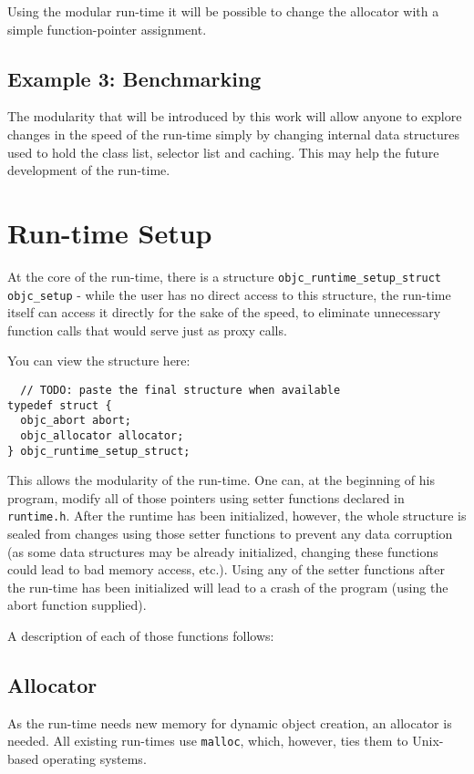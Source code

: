 Using the modular run-time it will be possible to change the allocator with a simple function-pointer assignment.


\subsection{Example 3: Benchmarking}

The modularity that will be introduced by this work will allow anyone to explore changes in the speed of the run-time simply by changing internal data structures used to hold the class list, selector list and caching. This may help the future development of the run-time.


\section{Run-time Setup}

At the core of the run-time, there is a structure \verb=objc_runtime_setup_struct objc_setup= - while the user has no direct access to this structure, the run-time itself can access it directly for the sake of the speed, to eliminate unnecessary function calls that would serve just as proxy calls.

You can view the structure here:

\begin{verbatim}
  // TODO: paste the final structure when available
typedef struct {
  objc_abort abort;
  objc_allocator allocator;
} objc_runtime_setup_struct;
\end{verbatim}

This allows the modularity of the run-time. One can, at the beginning of his program, modify all of those pointers using setter functions declared in \verb=runtime.h=. After the runtime has been initialized, however, the whole structure is sealed from changes using those setter functions to prevent any data corruption (as some data structures may be already initialized, changing these functions could lead to bad memory access, etc.). Using any of the setter functions after the run-time has been initialized will lead to a crash of the program (using the abort function supplied).

A description of each of those functions follows:

\subsection{Allocator}

As the run-time needs new memory for dynamic object creation, an allocator is needed. All existing run-times use \verb=malloc=, which, however, ties them to Unix-based operating systems.

